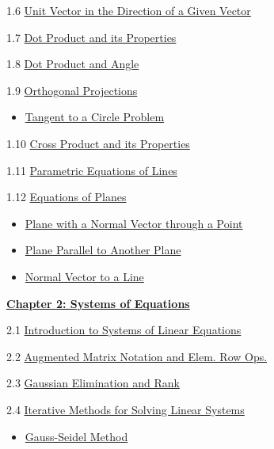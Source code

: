 \documentclass{ximera}
\begin{document}
1.6	\href{https://ximera.osu.edu/oerlinalg/LinearAlgebra/VEC-0036/main}{Unit Vector in the Direction of a Given Vector}
	
1.7	\href{https://ximera.osu.edu/oerlinalg/LinearAlgebra/VEC-0050/main}{Dot Product and its Properties}
	
1.8	\href{https://ximera.osu.edu/oerlinalg/LinearAlgebra/VEC-0060/main}{Dot Product and Angle }
	
1.9	\href{https://ximera.osu.edu/oerlinalg/LinearAlgebra/VEC-0070/main}{Orthogonal Projections}
\begin{itemize}
    \item 
    \href{https://www.geogebra.org/m/bngnjxee}{Tangent to a Circle Problem}
\end{itemize}
	
1.10	\href{https://ximera.osu.edu/oerlinalg/LinearAlgebra/VEC-0080/main}{Cross Product and its Properties}
	
1.11	\href{https://ximera.osu.edu/oerlinalg/LinearAlgebra/RRN-0020/main}{Parametric Equations of Lines}
	
1.12	\href{https://ximera.osu.edu/oerlinalg/LinearAlgebra/RRN-0030/main}{Equations of Planes}
\begin{itemize}
\item
\href{https://www.geogebra.org/m/gsaag2dx}{Plane with a Normal Vector through a Point}
\item
\href{https://www.geogebra.org/m/unceva9g}{Plane Parallel to Another Plane}
\item
\href{https://www.geogebra.org/m/tg2duwqk}{Normal Vector to a Line}
\end{itemize}	
\href{https://ximera.osu.edu/oerlinalg/LinearAlgebra/XLAChapter_systems/main}{\textbf{Chapter 2: Systems of Equations}}
	
2.1	\href{https://ximera.osu.edu/oerlinalg/LinearAlgebra/SYS-0020/main}{Introduction to Systems of Linear Equations}
	
2.2	\href{https://ximera.osu.edu/oerlinalg/LinearAlgebra/SYS-0030/main}{Augmented Matrix Notation and Elem. Row Ops.}
	
2.3	\href{https://ximera.osu.edu/oerlinalg/LinearAlgebra/SYS-0030/main}{Gaussian Elimination and Rank}
	
2.4	\href{https://ximera.osu.edu/oerlinalg/LinearAlgebra/SYS-0040/main}{Iterative Methods for Solving Linear Systems}
\begin{itemize}
    \item 
    \href{https://www.geogebra.org/m/hndq9nmq}{Gauss-Seidel Method}
\end{itemize}
	
\end{document}
